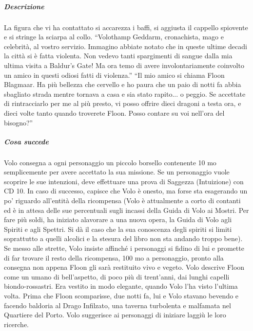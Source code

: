 \documentclass{article}
\begin{document}
\subparagraph{Descrizione} La figura che vi ha contattato si accarezza i baffi, si
aggiusta il cappello spiovente e si stringe la sciarpa
al collo. “Volothamp Geddarm, cronachista, mago e
celebrità, al vostro servizio. Immagino abbiate notato che
in queste ultime decadi la città si è fatta violenta. Non
vedevo tanti spargimenti di sangue dalla mia ultima visita
a Baldur's Gate! Ma ora temo di avere involontariamente
coinvolto un amico in questi odiosi fatti di violenza.”
“Il mio amico si chiama Floon Blagmaar. Ha più
bellezza che cervello e ho paura che un paio di notti fa
abbia sbagliato strada mentre tornava a casa e sia stato
rapito... o peggio. Se accettate di rintracciarlo per me al
più presto, vi posso offrire dieci dragoni a testa ora, e
dieci volte tanto quando troverete Floon. Posso contare
su voi nell'ora del bisogno?”

\subparagraph{Cosa succede} Volo consegna a ogni personaggio un piccolo borsello
contenente 10 mo semplicemente per avere accettato
la sua missione. Se un personaggio vuole scoprire le
sue intenzioni, deve effettuare una prova di Saggezza
(Intuizione) con CD 10. In caso di successo, capisce che
Volo è onesto, ma forse sta esagerando un po' riguardo
all'entità della ricompensa (Volo è attualmente a corto di
contanti ed è in attesa delle sue percentuali sugli incassi
della Guida di Volo ai Mostri. Per fare più soldi, ha iniziato
alavorare a una nuova opera, la Guida di Volo agli Spiriti e
agli Spettri. Si dà il caso che la sua conoscenza degli spiriti
si limiti soprattutto a quelli alcolici e la stesura del libro non
sta andando troppo bene). Se messo alle strette, Volo insiste
affinché i personaggi si fidino di lui e promette di far trovare
il resto della ricompensa, 100 mo a personaggio, pronto alla
consegna non appena Floon gli sarà restituito vivo e vegeto.
Volo descrive Floon come un umano di bell'aspetto, di
poco più di trent'anni, dai lunghi capelli biondo-rossastri.
Era vestito in modo elegante, quando Volo l’ha visto l’ultima
volta. Prima che Floon scomparisse, due notti fa, lui e Volo
stavano bevendo e facendo baldoria al Drago Infilzato, una
taverna turbolenta e malfamata nel Quartiere del Porto. Volo
suggerisce ai personaggi di iniziare laggiù le loro ricerche. 
\end{document}
